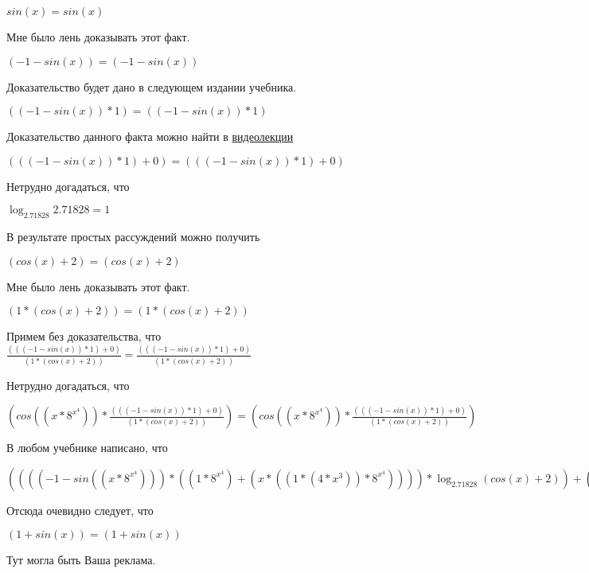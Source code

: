 \documentclass[12pt,a4paper,fleqn]{article}
\theoremstyle{definition}
\begin{document}
$sin( x ) = sin( x )$

Мне было лень доказывать этот факт.

$( -1  - sin( x )) = ( -1  - sin( x ))$

Доказательство будет дано в следующем издании учебника.

$(( -1  - sin( x )) *  1 ) = (( -1  - sin( x )) *  1 )$

Доказательство данного факта можно найти в \href{https://www.youtube.com/watch?v=dQw4w9WgXcQ}{видеолекции}

$((( -1  - sin( x )) *  1 ) +  0 ) = ((( -1  - sin( x )) *  1 ) +  0 )$

Нетрудно догадаться, что

$\log_{ 2.71828 }{ 2.71828 } =  1 $

В результате простых рассуждений можно получить

$(cos( x ) +  2 ) = (cos( x ) +  2 )$

Мне было лень доказывать этот факт.

$( 1  * (cos( x ) +  2 )) = ( 1  * (cos( x ) +  2 ))$

Примем без доказательства, что
$\frac{((( -1  - sin( x )) *  1 ) +  0 )}{( 1  * (cos( x ) +  2 ))}
 = \frac{((( -1  - sin( x )) *  1 ) +  0 )}{( 1  * (cos( x ) +  2 ))}
$

Нетрудно догадаться, что

$(cos(( x  * { 8 }^{{ x }^{ 4 }})) * \frac{((( -1  - sin( x )) *  1 ) +  0 )}{( 1  * (cos( x ) +  2 ))}
) = (cos(( x  * { 8 }^{{ x }^{ 4 }})) * \frac{((( -1  - sin( x )) *  1 ) +  0 )}{( 1  * (cos( x ) +  2 ))}
)$

В любом учебнике написано, что

$(((( -1  - sin(( x  * { 8 }^{{ x }^{ 4 }}))) * (( 1  * { 8 }^{{ x }^{ 4 }}) + ( x  * (( 1  * ( 4  * { x }^{ 3 })) * { 8 }^{{ x }^{ 4 }})))) * \log_{ 2.71828 }{(cos( x ) +  2 )}) + (cos(( x  * { 8 }^{{ x }^{ 4 }})) * \frac{((( -1  - sin( x )) *  1 ) +  0 )}{( 1  * (cos( x ) +  2 ))}
)) = (((( -1  - sin(( x  * { 8 }^{{ x }^{ 4 }}))) * (( 1  * { 8 }^{{ x }^{ 4 }}) + ( x  * (( 1  * ( 4  * { x }^{ 3 })) * { 8 }^{{ x }^{ 4 }})))) * \log_{ 2.71828 }{(cos( x ) +  2 )}) + (cos(( x  * { 8 }^{{ x }^{ 4 }})) * \frac{((( -1  - sin( x )) *  1 ) +  0 )}{( 1  * (cos( x ) +  2 ))}
))$

Отсюда очевидно следует, что

$( 1  + sin( x )) = ( 1  + sin( x ))$

Тут могла быть Ваша реклама.
\end{document}
